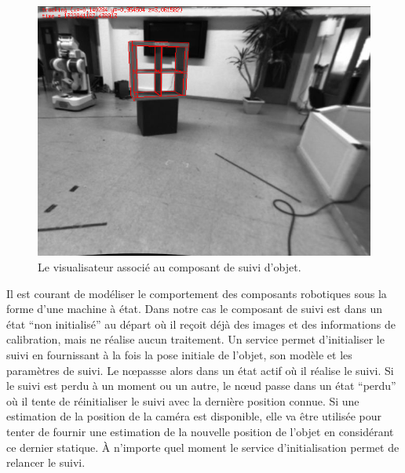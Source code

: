 \begin{figure}
  \begin{center}
    \includegraphics[width=.95\linewidth]{src/chap4-integration/shelf.png}
  \end{center}
  \caption{Le visualisateur associé au composant de suivi d'objet.}
\end{figure}



Il est courant de modéliser le comportement des composants robotiques
sous la forme d'une machine à état. Dans notre cas le composant de
suivi est dans un état ``non initialisé'' au départ où il reçoit déjà
des images et des informations de calibration, mais ne réalise aucun
traitement. Un service permet d'initialiser le suivi en fournissant à
la fois la pose initiale de l'objet, son modèle et les paramètres de
suivi. Le n\oe passse alors dans un état actif où il réalise le
suivi. Si le suivi est perdu à un moment ou un autre, le n\oe ud passe
dans un état ``perdu'' où il tente de réinitialiser le suivi avec la
dernière position connue. Si une estimation de la position de la
caméra est disponible, elle va être utilisée pour tenter de fournir
une estimation de la nouvelle position de l'objet en considérant ce
dernier statique. À n'importe quel moment le service d'initialisation
permet de relancer le suivi.


